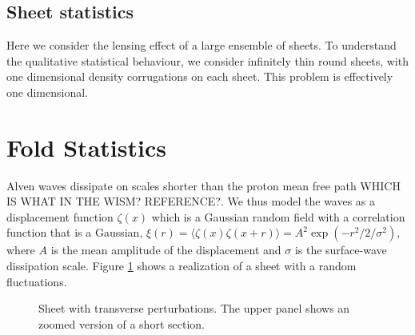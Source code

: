 \documentclass[useAMS,usenatbib]{mn2e}
\begin{document}
\subsection{Sheet statistics}

Here we consider the lensing effect of a large ensemble of sheets.  To
understand the qualitative statistical behaviour, we consider
infinitely thin round sheets, with one dimensional density
corrugations on each sheet.  This problem is effectively one dimensional.

\section{Fold Statistics}

Alven waves dissipate on scales shorter than the proton mean free
path WHICH IS WHAT IN THE WISM? REFERENCE?.  We thus model the waves as a displacement function $\zeta(x)$
which is a Gaussian random field with a correlation function that is a
Gaussian, $\xi(r)=\langle \zeta(x)
\zeta(x+r)\rangle=A^2\exp(-r^2/2/\sigma^2)$, where $A$ is the mean amplitude
of the displacement and $\sigma$ is the surface-wave
dissipation scale.  Figure \ref{fig:sheet} shows a realization of a
sheet with a random fluctuations.

\begin{figure}
\centerline{}
\caption{Sheet with transverse perturbations.  The upper panel shows
  an zoomed version of a short section.}
\label{fig:sheet}
\end{figure}
\end{document}
